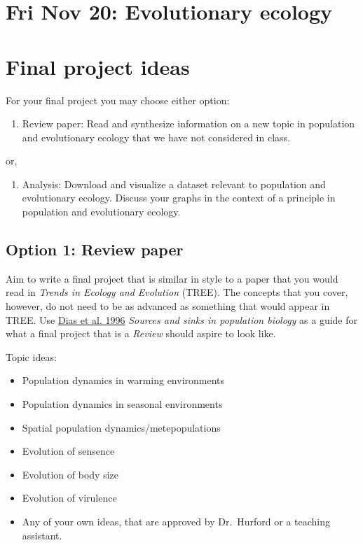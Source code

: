\documentclass[]{book}
\providecommand{\tightlist}{%
  \setlength{\itemsep}{0pt}\setlength{\parskip}{0pt}}
\begin{document}
\chapter{Fri Nov 20: Evolutionary
ecology}\label{fri-nov-20-evolutionary-ecology}

\chapter{Final project ideas}\label{final-project-ideas}

For your final project you may choose either option:

\begin{enumerate}
\def\labelenumi{\arabic{enumi}.}
\tightlist
\item
  Review paper: Read and synthesize information on a new topic in
  population and evolutionary ecology that we have not considered in
  class.
\end{enumerate}

or,

\begin{enumerate}
\def\labelenumi{\arabic{enumi}.}
\setcounter{enumi}{1}
\tightlist
\item
  Analysis: Download and visualize a dataset relevant to population and
  evolutionary ecology. Discuss your graphs in the context of a
  principle in population and evolutionary ecology.
\end{enumerate}

\section{Option 1: Review paper}\label{option-1-review-paper}

Aim to write a final project that is similar in style to a paper that
you would read in \emph{Trends in Ecology and Evolution} (TREE). The
concepts that you cover, however, do not need to be as advanced as
something that would appear in TREE. Use
\href{https://www-sciencedirect-com.qe2a-proxy.mun.ca/science/article/pii/0169534796100379?via\%3Dihub}{Dias
et al. 1996} \emph{Sources and sinks in population biology} as a guide
for what a final project that is a \emph{Review} should aspire to look
like.

Topic ideas:

\begin{itemize}
\item
  Population dynamics in warming environments
\item
  Population dynamics in seasonal environments
\item
  Spatial population dynamics/metepopulations
\item
  Evolution of sensence
\item
  Evolution of body size
\item
  Evolution of virulence
\item
  Any of your own ideas, that are approved by Dr.~Hurford or a teaching
  assistant.
\end{itemize}
\end{document}
